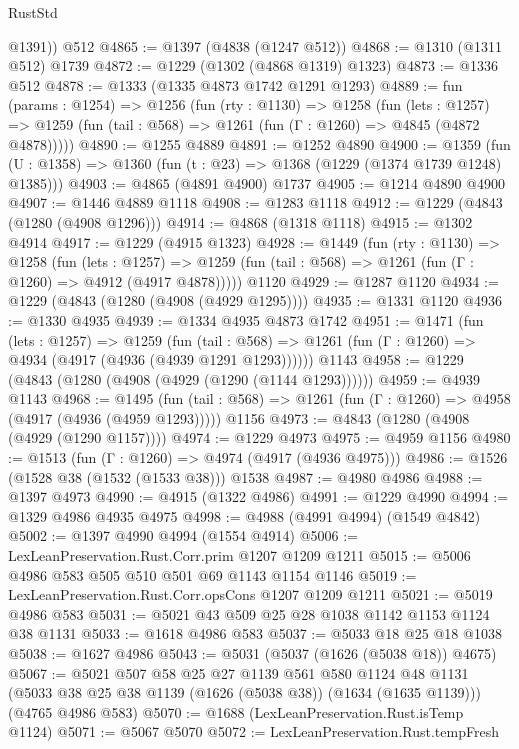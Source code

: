 \begin{lexlean}{RustStd}
\begin{coremodule}
        @1391))
    @512
@4865 := @1397 (@4838 (@1247 @512))
@4868 := @1310 (@1311 @512) @1739
@4872 := @1229 (@1302 (@4868 @1319) @1323)
@4873 := @1336 @512
@4878 := @1333 (@1335 @4873 @1742 @1291 @1293)
@4889 := fun (params : @1254) =>
  @1256
    (fun (rty : @1130) =>
    @1258
      (fun (lets : @1257) =>
      @1259 (fun (tail : @568) => @1261 (fun (Γ : @1260) => @4845 (@4872 @4878)))))
@4890 := @1255 @4889
@4891 := @1252 @4890
@4900 := @1359 (fun (U : @1358) => @1360 (fun (t : @23) => @1368 (@1229 (@1374 @1739 @1248) @1385)))
@4903 := @4865 (@4891 @4900) @1737
@4905 := @1214 @4890 @4900
@4907 := @1446 @4889 @1118
@4908 := @1283 @1118
@4912 := @1229 (@4843 (@1280 (@4908 @1296)))
@4914 := @4868 (@1318 @1118)
@4915 := @1302 @4914
@4917 := @1229 (@4915 @1323)
@4928 := @1449
    (fun (rty : @1130) =>
    @1258
      (fun (lets : @1257) =>
      @1259 (fun (tail : @568) => @1261 (fun (Γ : @1260) => @4912 (@4917 @4878)))))
    @1120
@4929 := @1287 @1120
@4934 := @1229 (@4843 (@1280 (@4908 (@4929 @1295))))
@4935 := @1331 @1120
@4936 := @1330 @4935
@4939 := @1334 @4935 @4873 @1742
@4951 := @1471
    (fun (lets : @1257) =>
    @1259
      (fun (tail : @568) => @1261 (fun (Γ : @1260) => @4934 (@4917 (@4936 (@4939 @1291 @1293))))))
    @1143
@4958 := @1229 (@4843 (@1280 (@4908 (@4929 (@1290 (@1144 @1293))))))
@4959 := @4939 @1143
@4968 := @1495
    (fun (tail : @568) => @1261 (fun (Γ : @1260) => @4958 (@4917 (@4936 (@4959 @1293)))))
    @1156
@4973 := @4843 (@1280 (@4908 (@4929 (@1290 @1157))))
@4974 := @1229 @4973
@4975 := @4959 @1156
@4980 := @1513 (fun (Γ : @1260) => @4974 (@4917 (@4936 @4975)))
@4986 := @1526 (@1528 @38 (@1532 (@1533 @38))) @1538
@4987 := @4980 @4986
@4988 := @1397 @4973
@4990 := @4915 (@1322 @4986)
@4991 := @1229 @4990
@4994 := @1329 @4986 @4935 @4975
@4998 := @4988 (@4991 @4994) (@1549 @4842)
@5002 := @1397 @4990 @4994 (@1554 @4914)
@5006 := LexLeanPreservation.Rust.Corr.prim @1207 @1209 @1211
@5015 := @5006 @4986 @583 @505 @510 @501 @69 @1143 @1154 @1146
@5019 := LexLeanPreservation.Rust.Corr.opsCons @1207 @1209 @1211
@5021 := @5019 @4986 @583
@5031 := @5021 @43 @509 @25 @28 @1038 @1142 @1153 @1124 @38 @1131
@5033 := @1618 @4986 @583
@5037 := @5033 @18 @25 @18 @1038
@5038 := @1627 @4986
@5043 := @5031 (@5037 (@1626 (@5038 @18)) @4675)
@5067 := @5021
    @507
    @58
    @25
    @27
    @1139
    @561
    @580
    @1124
    @48
    @1131
    (@5033 @38 @25 @38 @1139 (@1626 (@5038 @38)) (@1634 (@1635 @1139)))
    (@4765 @4986 @583)
@5070 := @1688 (LexLeanPreservation.Rust.isTemp @1124)
@5071 := @5067 @5070
@5072 := LexLeanPreservation.Rust.tempFresh

\end{coremodule}
\end{lexlean}
